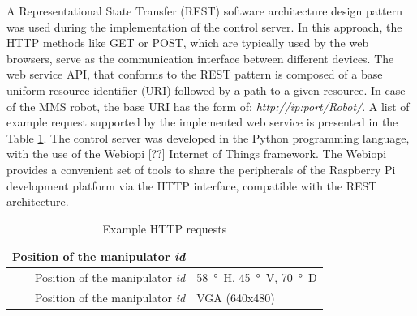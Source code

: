 A Representational State Transfer (REST) software architecture design pattern was used during the implementation of the control server. In this approach, the HTTP methods like GET or POST, which are typically used by the web browsers, serve as the communication interface between different devices. The web service API, that conforms to the REST pattern is composed of a base uniform resource identifier (URI) followed by a path to a given resource. In case of the MMS robot, the base URI has the form of: \textit{http://ip:port/Robot/}. A list of example request supported by the implemented web service is presented in the Table \ref{tab:rest}. The control server was developed in the Python programming language, with the use of the Webiopi [??] Internet of Things framework. The Webiopi provides a convenient set of tools to share the peripherals of the Raspberry Pi development platform via the HTTP interface, compatible with the REST architecture.


\begin{table}[H]

\begin{center}

\begin{tabular}{r||l}
\hline
Position of the manipulator \textit{id} \\

\hline
Position of the manipulator \textit{id}        & \SI{58}{\degree H}, \SI{45}{\degree V}, \SI{70}{\degree D} \\

\hline
Position of the manipulator \textit{id} & VGA (640x480) \\

\hline
\end{tabular}
\caption{Example HTTP requests}
\label{tab:rest}
\end{center}
\end{table}